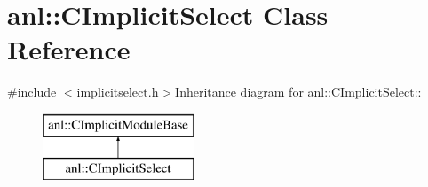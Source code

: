 \hypertarget{classanl_1_1CImplicitSelect}{
\section{anl::CImplicitSelect Class Reference}
\label{classanl_1_1CImplicitSelect}
}


{\ttfamily \#include $<$implicitselect.h$>$}Inheritance diagram for anl::CImplicitSelect::\begin{figure}[H]
\begin{center}
\leavevmode
\includegraphics[height=2cm]{classanl_1_1CImplicitSelect}
\end{center}
\end{figure}
